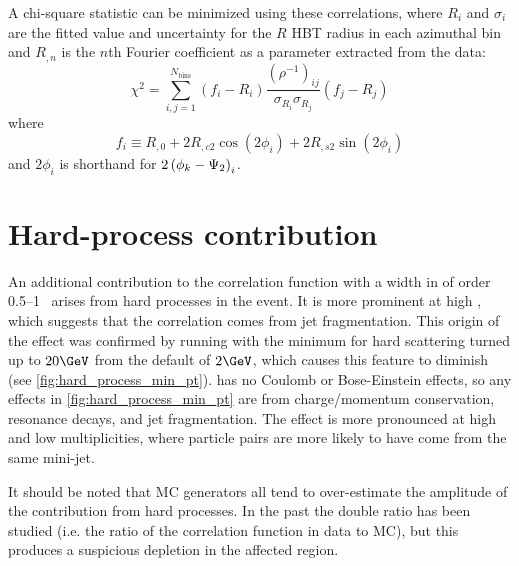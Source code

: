 A chi-square statistic can be minimized using these correlations, where $R_i$ and $\sigma_{i}$ are the fitted value and uncertainty for the $R$ HBT radius in each azimuthal bin and $R_{,n}$ is the $n$th Fourier coefficient as a parameter extracted from the data:
\begin{equation} \label{eq:chi_sq_mod}
\chi^2 = \sum_{i,j=1}^{N_\textrm{bins}} \left( f_i - R_i \right) \frac{(\rho^{-1})_{ij}}{\sigma_{R_i} \sigma_{R_j}} \left( f_j - R_j \right)
\end{equation}
where
\[f_i \equiv R_{,0} + 2R_{,c2}\cos(2\phi_i) + 2R_{,s2}\sin(2\phi_i)\]
and $2\phi_i$ is shorthand for $2\left(\phi_{k}-\Psi_{2}\right)_i$.


\FloatBarrier
\section{Hard-process contribution}
\label{sec:jet_frag}

An additional contribution to the correlation function with a width in \qinv of order 0.5--1 \GeV\ arises from hard processes in the event.
It is more prominent at high \kt, which suggests that the correlation comes from jet fragmentation.
This origin of the effect was confirmed by running \Hijing with the minimum \pt for hard scattering turned up to $20 \GeV$ from the default of $2 \GeV$, which causes this feature to diminish (see \cref{fig:hard_process_min_pt}).
\Hijing has no Coulomb or Bose-Einstein effects, so any effects in \cref{fig:hard_process_min_pt} are from charge/momentum conservation, resonance decays, and jet fragmentation.
The effect is more pronounced at high \kt and low multiplicities, where particle pairs are more likely to have come from the same mini-jet.

It should be noted that MC generators all tend to over-estimate the amplitude of the contribution from hard processes.
In the past the double ratio has been studied (i.e. the ratio of the correlation function in data to MC), but this produces a suspicious depletion in the affected \qinv region.


